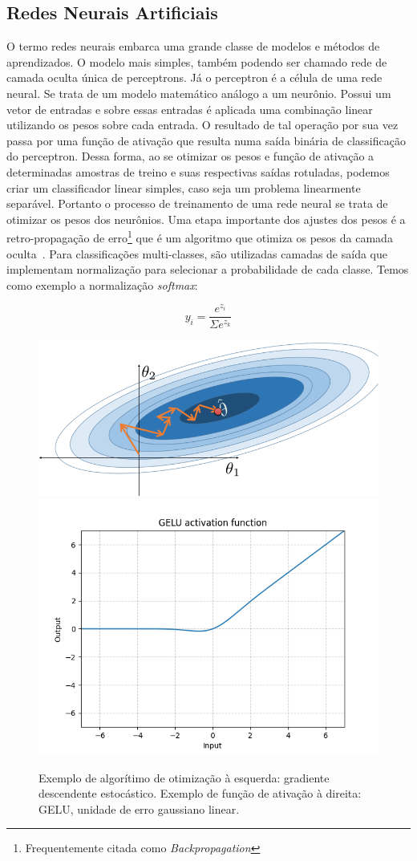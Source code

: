 \subsection{Redes Neurais Artificiais}\label{sec:Cap2_redes_neurais}

O termo redes neurais embarca uma grande classe de modelos e métodos de aprendizados. O modelo mais simples, também podendo ser chamado rede de camada oculta única de perceptrons. Já o  perceptron é a célula de uma rede neural. Se trata de um modelo matemático análogo a um neurônio. Possui um vetor de entradas e sobre essas entradas é aplicada uma combinação linear utilizando os pesos sobre cada entrada. O resultado de tal operação por sua vez passa por uma função de ativação que resulta numa saída binária de classificação do perceptron. Dessa forma, ao se otimizar os pesos e função de ativação a determinadas amostras de treino e suas respectivas saídas rotuladas, podemos criar um classificador linear simples, caso seja um problema linearmente separável. Portanto o processo de treinamento de uma rede neural se trata de otimizar os pesos dos neurônios. 
Uma etapa importante dos ajustes dos pesos é a retro-propagação de erro\footnote{Frequentemente citada como \textit{Backpropagation}} que é um algoritmo que otimiza os pesos da camada oculta~\cite{hastie01statisticallearning}. Para classificações multi-classes, são utilizadas camadas de saída que implementam normalização para selecionar a probabilidade de cada classe.
Temos como exemplo a normalização \textit{softmax}: 

$$y_i=\frac{e^{z_i}} {\Sigma e^{z_k}}$$
\begin{figure}[!ht]
    \centering
    \includegraphics[width=0.47\columnwidth]{
        Imagens/stochastic_gradient_descent.PNG
    }
    \includegraphics[width=0.47\columnwidth]{
        Imagens/GELU.PNG
    }
    \caption{Exemplo de algorítimo de otimização à esquerda: gradiente descendente estocástico. Exemplo de função de ativação à direita: GELU, unidade de erro gaussiano linear.}
    \label{fig:SGD_GELU}
\end{figure}


